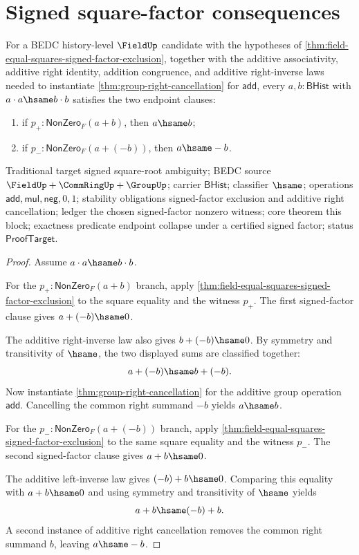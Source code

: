 \section{Signed square-factor consequences}
\label{sec:field-signed-square-factor-consequences}

\begin{theorem}
\label{thm:field-equal-squares-signed-factor-endpoint-collapse}
For a BEDC history-level $\FieldUp$ candidate with the hypotheses of
\autoref{thm:field-equal-squares-signed-factor-exclusion}, together with the
additive associativity, additive right identity, addition congruence, and
additive right-inverse laws needed to instantiate
\autoref{thm:group-right-cancellation} for $\mathsf{add}$, every
$a,b:\mathsf{BHist}$ with $a\cdot a\hsame b\cdot b$ satisfies the two
endpoint clauses:
\begin{enumerate}
\item if $p_+:\mathsf{NonZero}_F(a+b)$, then $a\hsame b$;
\item if $p_-:\mathsf{NonZero}_F(a+(-b))$, then $a\hsame -b$.
\end{enumerate}
Traditional target signed square-root ambiguity; BEDC source $\FieldUp +
\CommRingUp + \GroupUp$; carrier $\mathsf{BHist}$; classifier $\hsame$;
operations $\mathsf{add},\mathsf{mul},\mathsf{neg},0,1$; stability obligations
signed-factor exclusion and additive right cancellation; ledger the chosen
signed-factor nonzero witness; core theorem this block; exactness predicate
endpoint collapse under a certified signed factor; status $\mathsf{ProofTarget}$.
\end{theorem}
\begin{proof}
Assume $a\cdot a\hsame b\cdot b$.

For the $p_+:\mathsf{NonZero}_F(a+b)$ branch, apply
\autoref{thm:field-equal-squares-signed-factor-exclusion} to the square
equality and the witness $p_+$. The first signed-factor clause gives
$a+(-b)\hsame0$.

The additive right-inverse law also gives $b+(-b)\hsame0$. By symmetry and
transitivity of $\hsame$, the two displayed sums are classified together:
$$
a+(-b)\hsame b+(-b).
$$
Now instantiate \autoref{thm:group-right-cancellation} for the additive group
operation $\mathsf{add}$. Cancelling the common right summand $-b$ yields
$a\hsame b$.

For the $p_-:\mathsf{NonZero}_F(a+(-b))$ branch, apply
\autoref{thm:field-equal-squares-signed-factor-exclusion} to the same square
equality and the witness $p_-$. The second signed-factor clause gives
$a+b\hsame0$.

The additive left-inverse law gives $(-b)+b\hsame0$. Comparing this equality
with $a+b\hsame0$ and using symmetry and transitivity of $\hsame$ yields
$$
a+b\hsame (-b)+b.
$$
A second instance of additive right cancellation removes the common right
summand $b$, leaving $a\hsame -b$.
\end{proof}

